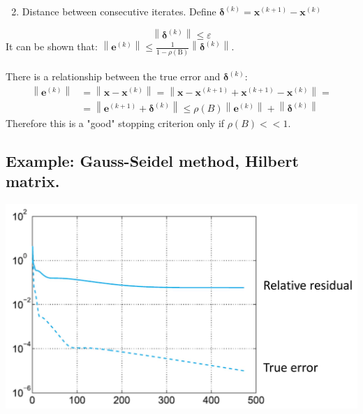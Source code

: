 \documentclass[11pt]{book}
\begin{document}
\begin{enumerate}
  \setcounter{enumi}{1}
  \item Distance between consecutive iterates. Define $\boldsymbol{\delta}^{(k)}=\mathbf{x}^{(k+1)}-\mathbf{x}^{(k)}$
\end{enumerate}
$$
\left\|\boldsymbol{\delta}^{(k)}\right\| \leq \varepsilon
$$
It can be shown that: $\left\|\mathbf{e}^{(k)}\right\| \leq \frac{1}{1 -\rho(\mathrm{B})}\left\|\boldsymbol{\delta}^{(k)}\right\| $.\\ \\
There is a relationship between the true error and $\boldsymbol{\delta}^{(k)}$:
$$\begin{aligned}\left\|\boldsymbol{e}^{(k)}\right\| & =\left\|\boldsymbol{x}-\boldsymbol{x}^{(k)}\right\|=\left\|\boldsymbol{x}-\boldsymbol{x}^{(k+1)}+\boldsymbol{x}^{(k+1)}-\boldsymbol{x}^{(k)}\right\|= \\ & =\left\|\boldsymbol{e}^{(k+1)}+\boldsymbol{\delta}^{(k)}\right\| \leq \rho(B)\left\|\boldsymbol{e}^{(k)}\right\|+\left\|\boldsymbol{\delta}^{(k)}\right\|\end{aligned}$$
Therefore this is a "good" stopping criterion only if $\rho(B)<<1$.
\subsection*{Example: Gauss-Seidel method, Hilbert matrix.}
\begin{center}
\includegraphics[max width=\textwidth]{2023_09_05_b72ccc85584d9dc6fb5cg-054}
\end{center}
\end{document}
